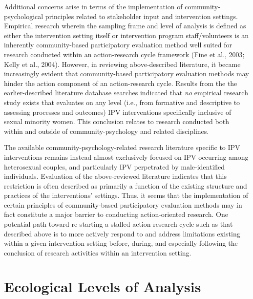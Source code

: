 \documentclass[11pt,]{tufte-book}
\begin{document}
Additional concerns arise in terms of the implementation of
community-psychological principles related to stakeholder input and
intervention settings. Empirical research wherein the sampling frame and
level of analysis is defined as either the intervention setting itself
or intervention program staff/volunteers is an inherently
community-based participatory evaluation method well suited for research
conducted within an action-research cycle framework (Fine et al., 2003;
Kelly et al., 2004). However, in reviewing above-described literature,
it became increasingly evident that community-based participatory
evaluation methods may hinder the action component of an action-research
cycle. Results from the the earlier-described literature database
searches indicated that \emph{no} empirical research study exists that
evaluates on any level (i.e., from formative and descriptive to
assessing processes and outcomes) IPV interventions specifically
inclusive of sexual minority women. This conclusion relates to research
conducted both within and outside of community-psychology and related
disciplines.

The available community-psychology-related research literature specific
to IPV interventions remains instead almost exclusively focused on IPV
occurring among heterosexual couples, and particularly IPV perpetrated
by male-identified individuals. Evaluation of the above-reviewed
literature indicates that this restriction is often described as
primarily a function of the existing structure and practices of the
interventions' settings. Thus, it seems that the implementation of
certain principles of community-based participatory evaluation methods
may in fact constitute a major barrier to conducting action-oriented
research. One potential path toward re-starting a stalled
action-research cycle such as that described above is to more actively
respond to and address limitations existing within a given intervention
setting before, during, and especially following the conclusion of
research activities within an intervention setting.

\chapter{Ecological Levels of
Analysis}\label{ecological-levels-of-analysis}
\end{document}
